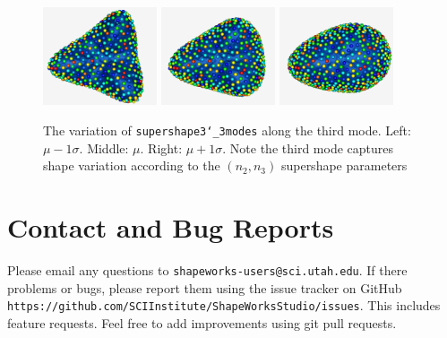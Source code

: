 \documentclass[letterpaper,12pt]{article}   %
\begin{document}
\vspace{0.1in}
\begin{figure}[!htp]
\centering
\includegraphics[width=0.3\textwidth]{figs/supershapes_3mode_mod3_neg1std.png}
\includegraphics[width=0.3\textwidth]{figs/supershapes_3mode_mod3_0std.png}
\includegraphics[width=0.3\textwidth]{figs/supershapes_3mode_mod3_1std.png}
\caption{The variation of \texttt{supershape3\char`_3modes} along the third mode. Left: $\mu - 1\sigma$. Middle: $\mu$. Right: $\mu + 1\sigma$. Note the third mode captures shape variation according to the $(n_2, n_3)$ supershape parameters}
\label{fig:supershape_3modes_mod3}
\end{figure}


\section{Contact and Bug Reports}

Please email any questions to \texttt{shapeworks-users@sci.utah.edu}. If there problems or bugs, please report them using the issue tracker on GitHub \texttt{https://github.com/SCIInstitute/ShapeWorksStudio/issues}. This includes feature requests. Feel free to add improvements using git pull requests. 

% 
%
\end{document}
